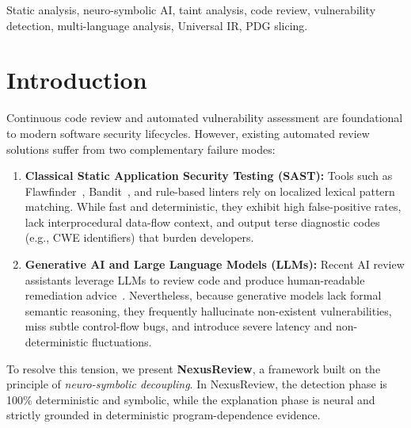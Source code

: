 \documentclass[10pt,conference]{IEEEtran}
\begin{document}
\begin{IEEEkeywords}
Static analysis, neuro-symbolic AI, taint analysis, code review, vulnerability detection, multi-language analysis, Universal IR, PDG slicing.
\end{IEEEkeywords}

\section{Introduction}

Continuous code review and automated vulnerability assessment are foundational to modern software security lifecycles. However, existing automated review solutions suffer from two complementary failure modes:

\begin{enumerate}
    \item \textbf{Classical Static Application Security Testing (SAST):} Tools such as Flawfinder~\cite{flawfinder}, Bandit~\cite{bandit}, and rule-based linters rely on localized lexical pattern matching. While fast and deterministic, they exhibit high false-positive rates, lack interprocedural data-flow context, and output terse diagnostic codes (e.g., CWE identifiers) that burden developers.
    \item \textbf{Generative AI and Large Language Models (LLMs):} Recent AI review assistants leverage LLMs to review code and produce human-readable remediation advice~\cite{deputydev}. Nevertheless, because generative models lack formal semantic reasoning, they frequently hallucinate non-existent vulnerabilities, miss subtle control-flow bugs, and introduce severe latency and non-deterministic fluctuations.
\end{enumerate}

To resolve this tension, we present \textbf{NexusReview}, a framework built on the principle of \emph{neuro-symbolic decoupling}. In NexusReview, the detection phase is 100\% deterministic and symbolic, while the explanation phase is neural and strictly grounded in deterministic program-dependence evidence.
\end{document}

